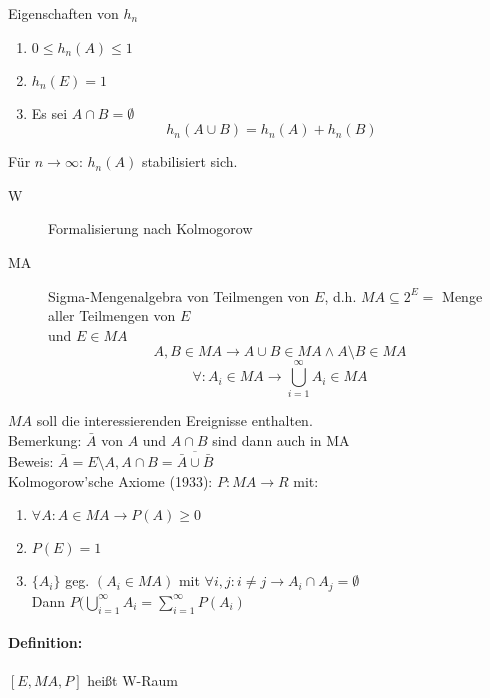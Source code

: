 \documentclass[a4paper,12pt]{scrartcl}
\begin{document}
Eigenschaften von $h_n$
\begin{enumerate}
 \item $0\leq h_n(A)\leq 1$
 \item $h_n(E) = 1$
 \item Es sei $A\cap B = \emptyset$\\
 $$h_n(A\cup B) = h_n(A) + h_n(B) $$
\end{enumerate}

Für $n\rightarrow\infty$: $h_n(A)$ stabilisiert sich.

\begin{description}
 \item[W] Formalisierung nach Kolmogorow
 \item[MA] Sigma-Mengenalgebra von Teilmengen von $E$, d.h. $MA\subseteq 2^E =$ Menge aller Teilmengen von $E$\\
 und $E\in MA$
 $$A,B\in MA \rightarrow A\cup B \in MA \land A\setminus B\in MA$$
 $$\forall : A_i \in MA \rightarrow \bigcup^{\infty}_{i=1} A_i\in MA$$
\end{description}

$MA$ soll \glqq{}die interessierenden\grqq{} Ereignisse enthalten.\\
Bemerkung: $\bar{A}$ von $A$ und $A\cap B$ sind dann auch in MA\\
Beweis: $\bar{A} = E\setminus A, A\cap B = \overline{\bar{A}\cup\bar{B}}$
\\
Kolmogorow'sche Axiome (1933):
$P:\!MA\rightarrow R$ mit:
\begin{enumerate}
 \item $\forall A: A\in MA \rightarrow P(A) \geq 0 $
 \item $P(E) = 1$
 \item $\{A_i\}$ geg. $(A_i\in MA)$ mit $\forall i,j: i\neq j \rightarrow A_i \cap A_j = \emptyset$\\
 Dann $P(\bigcup^{\infty}_{i=1}A_i = \sum^{\infty}_{i=1}P(A_i)$
\end{enumerate}

\paragraph{Definition:} $[E,MA,P]$ heißt W-Raum\\
\end{document}
